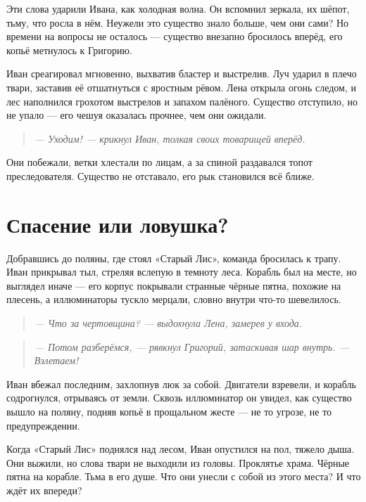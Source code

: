 \documentclass[12pt,a4paper]{book}
\newenvironment{dialogue}{\begin{quote}\itshape}{\end{quote}} %
\begin{document}
Эти слова ударили Ивана, как холодная волна. Он вспомнил зеркала, их шёпот, тьму, что росла в нём. Неужели это существо знало больше, чем они сами? Но времени на вопросы не осталось --- существо внезапно бросилось вперёд, его копьё метнулось к Григорию.

Иван среагировал мгновенно, выхватив бластер и выстрелив. Луч ударил в плечо твари, заставив её отшатнуться с яростным рёвом. Лена открыла огонь следом, и лес наполнился грохотом выстрелов и запахом палёного. Существо отступило, но не упало --- его чешуя оказалась прочнее, чем они ожидали.

\begin{dialogue}
--- Уходим! --- крикнул Иван, толкая своих товарищей вперёд.
\end{dialogue}

Они побежали, ветки хлестали по лицам, а за спиной раздавался топот преследователя. Существо не отставало, его рык становился всё ближе.

\section*{Спасение или ловушка?}

Добравшись до поляны, где стоял «Старый Лис», команда бросилась к трапу. Иван прикрывал тыл, стреляя вслепую в темноту леса. Корабль был на месте, но выглядел иначе --- его корпус покрывали странные чёрные пятна, похожие на плесень, а иллюминаторы тускло мерцали, словно внутри что-то шевелилось.

\begin{dialogue}
--- Что за чертовщина? --- выдохнула Лена, замерев у входа.
\end{dialogue}

\begin{dialogue}
--- Потом разберёмся, --- рявкнул Григорий, затаскивая шар внутрь. --- Взлетаем!
\end{dialogue}

Иван вбежал последним, захлопнув люк за собой. Двигатели взревели, и корабль содрогнулся, отрываясь от земли. Сквозь иллюминатор он увидел, как существо вышло на поляну, подняв копьё в прощальном жесте --- не то угрозе, не то предупреждении.

Когда «Старый Лис» поднялся над лесом, Иван опустился на пол, тяжело дыша. Они выжили, но слова твари не выходили из головы. Проклятье храма. Чёрные пятна на корабле. Тьма в его душе. Что они унесли с собой из этого места? И что ждёт их впереди?
\end{document}
